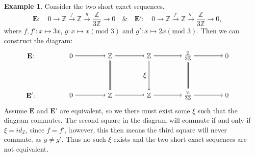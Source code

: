 \documentclass[11.5pt, twoside, a4paper, titlepage]{report}
\providecommand{\bb}[1]{\mathbb{#1}}
\theoremstyle{definition}
\newtheorem{eg}[mydef]{Example}
\theoremstyle{plain}
\begin{document}
\begin{eg}
Consider the two short exact sequences, 
\begin{equation*}
\mathbf{E}: \quad 0\xrightarrow{}\bb{Z}\xrightarrow{f}\bb{Z}\xrightarrow{g}\frac{\bb{Z}}{3\bb{Z}}\xrightarrow{}0  \quad \& \quad \mathbf{E'}: \quad 0\xrightarrow{}\bb{Z}\xrightarrow{f'}\bb{Z}\xrightarrow{g'}\frac{\bb{Z}}{3\bb{Z}}\xrightarrow{}0 ,
\end{equation*}
where $f, f': x\mapsto 3x$, $g: x \mapsto x(\text{mod }3)$ and $g':x\mapsto 2x(\text{mod }3)$. Then we can construct the diagram: 
\begin{equation*}
\begin{tikzpicture}[->,-latex, auto, main path/.style={->, semithick}, main node/.style={}]
\node	[main node]		(1) at (0,0)		{$\mathbf{E}$: \quad };
\node	[main node]		(2) at (2,0)		{$0$};
\node	[main node]		(3) at (4,0)		{$\bb{Z}$};
\node [main node]		(4) at (6,0)		{$\bb{Z}$};
\node [main node]		(5) at (8,0)		{$\frac{\bb{Z}}{3\bb{Z}}$};
\node	[main node]		(11) at (10,0)	{$0$};

\node	[main node]		(6) at (0,-2)		{$\mathbf{E'}$: \quad};
\node	[main node]		(7) at (2,-2)		{$0$};
\node	[main node]		(8) at (4,-2)		{$\bb{Z}$};
\node [main node]		(9) at (6,-2)		{$\bb{Z}$};
\node [main node]		(10) at (8,-2)	{$\frac{\bb{Z}}{3\bb{Z}}$};
\node [main node]		(13) at (10,-2)	{$0$};

\draw (2) edge [main path] node [auto] {$$} (3);
\draw (3) edge [main path] node [auto] {$$} (4);
\draw (4) edge [main path] node [auto] {$$} (5);
\draw (5) edge [main path] (11);


\draw (7) edge [main path] node [auto] {$$} (8);
\draw (8) edge [main path] node [auto] {$$} (9);
\draw (9) edge [main path] node [auto] {$$} (10);
\draw (10) edge [main path] (13);

\draw (3) edge [-, semithick, double, double distance=1.5pt] (8);
\draw (4) edge [main path] node [auto, swap] {$\xi$} (9);
\draw (5) edge [-, semithick, double, double distance=1.5pt](10);
\end{tikzpicture}
\end{equation*}
Assume $\mathbf{E}$ and $\mathbf{E'}$ are equivalent, so we there must exist some $\xi$ such that the diagram commutes. The second square in the diagram will commute if and only if $\xi=id_{\bb{Z}}$, since $f=f'$, however, this then means the third square will never commute, as $g\neq g'$. Thus no such $\xi$ exists and the two short exact sequences are not equivalent.
\end{eg}
\end{document}
